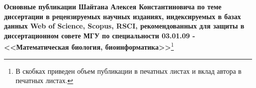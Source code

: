 


\medskip
{} 
\textbf{Основные публикации Шайтана Алексея Константиновича по теме диссертации в рецензируемых научных изданиях, индексируемых в базах данных Web of Science, Scopus, RSCI, рекомендованных для защиты в диссертационном совете МГУ по специальности 03.01.09 - <<Математическая биология, биоинформатика>>}\footnote{В скобках приведен объем публикации в печатных листах и вклад автора в печатных листах.}
